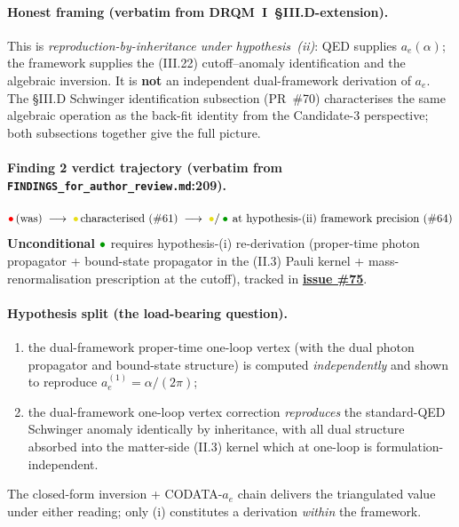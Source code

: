 \paragraph{Honest framing (verbatim from DRQM~I~\S III.D-extension).}
This is \emph{reproduction-by-inheritance under hypothesis~(ii)}: QED supplies
$a_e(\alpha)$; the framework supplies the (III.22) cutoff--anomaly
identification and the algebraic inversion. It is \textbf{not} an independent
dual-framework derivation of $a_e$. The \S III.D Schwinger identification
subsection (PR~\#70) characterises the same algebraic operation as the
back-fit identity from the Candidate-3 perspective; both subsections together
give the full picture.

\paragraph{Finding 2 verdict trajectory (verbatim from
\texttt{FINDINGS\_for\_author\_review.md}:209).}
\[
\mathbin{\hbox{\color{red}\(\bullet\)}}\,\text{(was)}
\;\longrightarrow\;
\mathbin{\hbox{\color{yellow!90!black}\(\bullet\)}}\,\text{characterised (\#61)}
\;\longrightarrow\;
\mathbin{\hbox{\color{yellow!90!black}\(\bullet\)}}/
\mathbin{\hbox{\color{green!60!black}\(\bullet\)}}\,
\text{at hypothesis-(ii) framework precision (\#64)}
\]
\textbf{Unconditional} $\mathbin{\hbox{\color{green!60!black}\(\bullet\)}}$
requires hypothesis-(i) re-derivation (proper-time photon propagator +
bound-state propagator in the (II.3) Pauli kernel + mass-renormalisation
prescription at the cutoff), tracked in
\textbf{\href{https://github.com/temoTxt/PyPhysics/issues/75}{issue \#75}}.

\paragraph{Hypothesis split (the load-bearing question).}
\begin{enumerate}[topsep=2pt,itemsep=0pt,label=(\roman*)]
  \item the dual-framework proper-time one-loop vertex (with the dual photon
        propagator and bound-state structure) is computed \emph{independently}
        and shown to reproduce $a_e^{(1)} = \alpha/(2\pi)$;
  \item the dual-framework one-loop vertex correction \emph{reproduces} the
        standard-QED Schwinger anomaly identically by inheritance, with all
        dual structure absorbed into the matter-side (II.3) kernel which at
        one-loop is formulation-independent.
\end{enumerate}
The closed-form inversion + CODATA-$a_e$ chain delivers the triangulated value
under either reading; only (i) constitutes a derivation \emph{within} the
framework.

